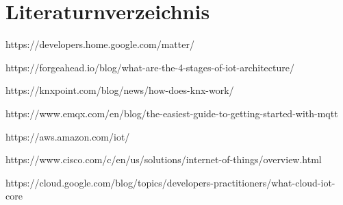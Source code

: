 \documentclass[12pt, a4paper]{article}
\begin{document}
\pagebreak
\section{Literaturnverzeichnis}
\par https://developers.home.google.com/matter/
\par https://forgeahead.io/blog/what-are-the-4-stages-of-iot-architecture/
\par https://knxpoint.com/blog/news/how-does-knx-work/
\par https://www.emqx.com/en/blog/the-easiest-guide-to-getting-started-with-mqtt
\par https://aws.amazon.com/iot/
\par https://www.cisco.com/c/en/us/solutions/internet-of-things/overview.html
\par https://cloud.google.com/blog/topics/developers-practitioners/what-cloud-iot-core
\pagebreak
\listoffigures
{}
\end{document}
